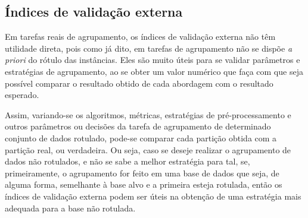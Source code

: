 





\subsection{Índices de validação externa}

Em tarefas reais de agrupamento, os índices de validação externa não têm utilidade direta, pois como já dito, em tarefas de agrupamento não se dispõe \emph{a priori} do rótulo das instâncias. Eles são muito úteis para se validar parâmetros e estratégias de agrupamento, ao se obter um valor numérico que faça com que seja possível comparar o resultado obtido  de cada abordagem com o resultado esperado.

Assim, variando-se os algoritmos, métricas, estratégias de pré-processamento e outros parâmetros ou decisões da tarefa de agrupamento de determinado conjunto de dados rotulado, pode-se comparar cada partição obtida com a partição real, ou verdadeira. Ou seja, caso se deseje realizar o agrupamento de dados não rotulados, e não se sabe a melhor estratégia para tal, se, primeiramente,  o agrupamento for feito em uma base de dados que seja, de alguma forma, semelhante à base alvo e a primeira esteja rotulada, então os índices de validação externa podem ser úteis na obtenção de uma estratégia mais adequada para a base não rotulada. %

